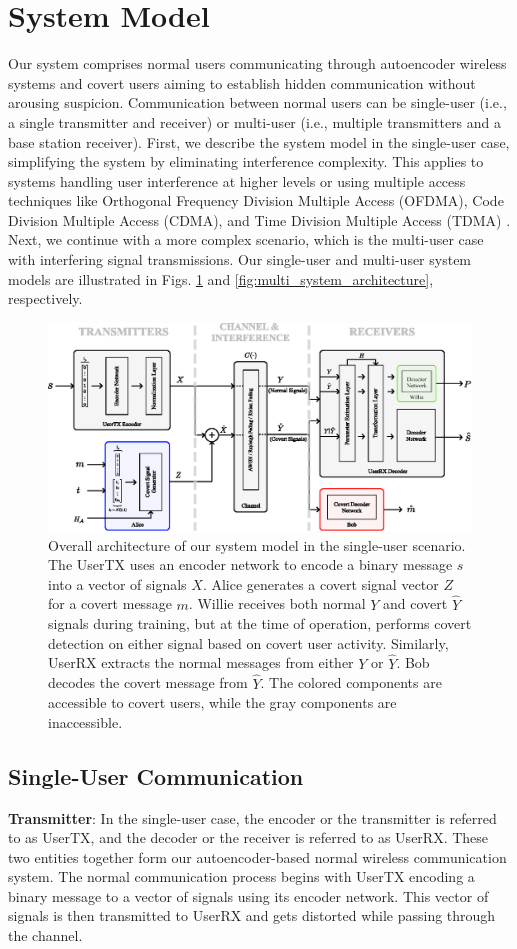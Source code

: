 \section{System Model}
\label{s:model}
Our system comprises normal users communicating through autoencoder wireless systems and covert users aiming to establish hidden communication without arousing suspicion. Communication between normal users can be single-user (i.e., a single transmitter and receiver) or multi-user (i.e., multiple transmitters and a base station receiver). First, we describe the system model in the single-user case, simplifying the system by eliminating interference complexity. This applies to systems handling user interference at higher levels or using multiple access techniques like Orthogonal Frequency Division Multiple Access (OFDMA), Code Division Multiple Access (CDMA), and Time Division Multiple Access (TDMA) \cite{WALRAND2000305}. Next, we continue with a more complex scenario, which is the multi-user case with interfering signal transmissions. Our single-user and multi-user system models are illustrated in Figs. \ref{fig:system_architecture} and \ref{fig:multi_system_architecture}, respectively.
\begin{figure}[tp!]
	\center
	\includegraphics[width=.7\linewidth]{figs/system_architecture}
	\caption{Overall architecture of our system model in the single-user scenario. The UserTX uses an encoder network to encode a binary message $s$ into a vector of signals $X$. Alice generates a covert signal vector $Z$ for a covert message $m$. Willie receives both normal $Y$ and covert $\hat{Y}$ signals during training, but at the time of operation, performs covert detection on either signal based on covert user activity. Similarly, UserRX extracts the normal messages from either $Y$ or $\hat{Y}$. Bob decodes the covert message from $\hat{Y}$. The colored components are accessible to covert users, while the gray components are inaccessible.}	
	\label{fig:system_architecture}
\end{figure}

\subsection{Single-User Communication}
\textbf{Transmitter}: In the single-user case, the encoder or the transmitter is referred to as UserTX, and the decoder or the receiver is referred to as UserRX. These two entities together form our autoencoder-based normal wireless communication system. The normal communication process begins with UserTX encoding a binary message to a vector of signals using its encoder network. This vector of signals is then transmitted to UserRX and gets distorted while passing through the channel.

